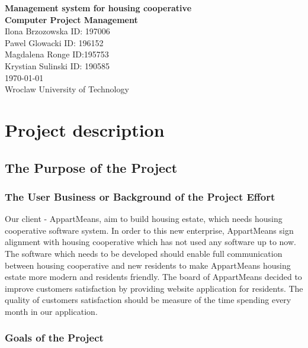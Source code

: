 \documentclass[a4paper,11pt,onecolumn,oneside]{book}
\newcommand{\hilight}[1]{\colorbox{blue!30!}{#1}}
\begin{document}
\begin{titlepage}
\begin{center}
\textbf{\LARGE Management system for housing cooperative}\\ [2ex]\textbf{Computer Project Management }\\
[45ex]Ilona Brzozowska ID: 197006  \\ Pawel Glowacki ID: 196152 \\
 \hilight{Magdalena Ronge ID:195753} \\ Krystian Sulinski ID: 190585 \\
{\today} \\
[70ex]{Wroclaw University of Technology} \\
\end{center}
\end{titlepage}

\tableofcontents

\chapter{Project description}

\section{The Purpose of the Project}



\subsection{The User Business or Background of the Project Effort}

Our client - AppartMeans, aim to build housing estate, which needs housing cooperative software
system. In order to this new enterprise, AppartMeans sign alignment with housing cooperative
which has not used any software up to now. The software which needs to be developed should
enable full communication between housing cooperative and new residents to make AppartMeans
housing estate more modern and residents friendly. The board of AppartMeans decided to
improve customers satisfaction by providing website application for residents. The quality of
customers satisfaction should be measure of the time spending every month in our application.



\subsection{Goals of the Project}
\end{document}

